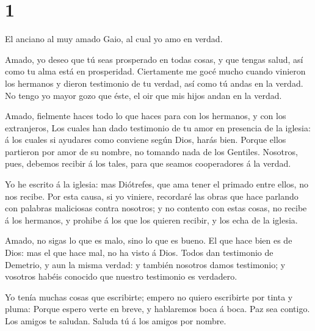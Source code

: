 \hypertarget{section}{%
\section{1}\label{section}}

 El anciano al muy amado Gaio, al cual yo amo en verdad.

 Amado, yo deseo que tú seas prosperado en todas cosas, y
que tengas salud, así como tu alma está en prosperidad. 
Ciertamente me gocé mucho cuando vinieron los hermanos y dieron
testimonio de tu verdad, así como tú andas en la verdad.  No
tengo yo mayor gozo que éste, el oir que mis hijos andan en la verdad.

 Amado, fielmente haces todo lo que haces para con los
hermanos, y con los extranjeros,  Los cuales han dado
testimonio de tu amor en presencia de la iglesia: á los cuales si
ayudares como conviene según Dios, harás bien.  Porque ellos
partieron por amor de su nombre, no tomando nada de los Gentiles.
 Nosotros, pues, debemos recibir á los tales, para que
seamos cooperadores á la verdad.

 Yo he escrito á la iglesia: mas Diótrefes, que ama tener el
primado entre ellos, no nos recibe.  Por esta causa, si yo
viniere, recordaré las obras que hace parlando con palabras maliciosas
contra nosotros; y no contento con estas cosas, no recibe á los
hermanos, y prohibe á los que los quieren recibir, y los echa de la
iglesia.

 Amado, no sigas lo que es malo, sino lo que es bueno. El
que hace bien es de Dios: mas el que hace mal, no ha visto á Dios.
 Todos dan testimonio de Demetrio, y aun la misma verdad: y
también nosotros damos testimonio; y vosotros habéis conocido que
nuestro testimonio es verdadero.

 Yo tenía muchas cosas que escribirte; empero no quiero
escribirte por tinta y pluma:  Porque espero verte en
breve, y hablaremos boca á boca. Paz sea contigo. Los amigos te saludan.
Saluda tú á los amigos por nombre.
